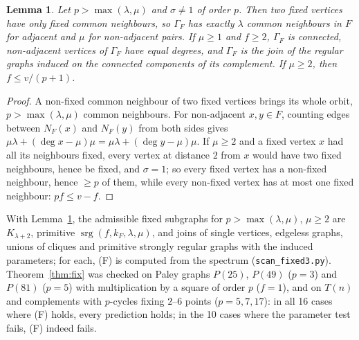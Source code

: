 \documentclass[11pt,a4paper]{article}
\newtheorem{lemma}[theorem]{Lemma}
\theoremstyle{remark}
\newcommand{\srg}{\operatorname{srg}}
\begin{document}
\begin{lemma}\label{lem:bigp}
Let $p>\max(\lambda,\mu)$ and $\sigma\ne1$ of order $p$. Then two fixed vertices have only fixed common neighbours, so $\Gamma_F$ has
exactly $\lambda$ common neighbours in $F$ for adjacent and $\mu$ for non-adjacent pairs. If $\mu\ge1$ and $f\ge2$, $\Gamma_F$ is
connected, non-adjacent vertices of $\Gamma_F$ have equal degrees, and $\Gamma_F$ is the join of the regular graphs induced on the
connected components of its complement. If $\mu\ge2$, then $f\le v/(p+1)$.
\end{lemma}
\begin{proof}
A non-fixed common neighbour of two fixed vertices brings its whole orbit, $p>\max(\lambda,\mu)$ common neighbours. For non-adjacent
$x,y\in F$, counting edges between $N_F(x)$ and $N_F(y)$ from both sides gives $\mu\lambda+(\deg x-\mu)\mu=\mu\lambda+(\deg y-\mu)\mu$.
If $\mu\ge2$ and a fixed vertex $x$ had all its neighbours fixed, every vertex at distance $2$ from $x$ would have two fixed
neighbours, hence be fixed, and $\sigma=1$; so every fixed vertex has a non-fixed neighbour, hence $\ge p$ of them, while every
non-fixed vertex has at most one fixed neighbour: $pf\le v-f$.
\end{proof}

With Lemma~\ref{lem:bigp}, the admissible fixed subgraphs for $p>\max(\lambda,\mu)$, $\mu\ge2$ are $K_{\lambda+2}$, primitive
$\srg(f,k_F,\lambda,\mu)$, and joins of single vertices, edgeless graphs, unions of cliques and primitive strongly regular graphs
with the induced parameters; for each, (F) is computed from the spectrum (\texttt{scan\_fixed3.py}). Theorem~\ref{thm:fix} was
checked on Paley graphs $P(25)$, $P(49)$ ($p=3$) and $P(81)$ ($p=5$) with multiplication by a square of order $p$ ($f=1$), and on
$T(n)$ and complements with $p$-cycles fixing $2$--$6$ points ($p=5,7,17$): in all 16 cases where (F) holds, every prediction holds;
in the 10 cases where the parameter test fails, (F) indeed fails.
\end{document}
